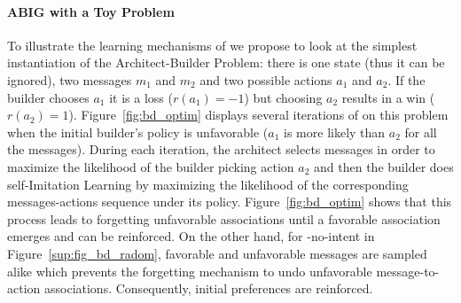 \paragraph{ABIG with a Toy Problem}

To illustrate the learning mechanisms of \abig we propose to look at the simplest instantiation of the Architect-Builder Problem: there is one state (thus it can be ignored), two messages $m_1$ and $m_2$ and two possible actions $a_1$ and $a_2$. If the builder chooses $a_1$ it is a loss ($r(a_1) = -1$) but choosing $a_2$ results in a win ($r(a_2) = 1$). Figure~\ref{fig:bd_optim} displays several iterations of \abig on this problem when the initial builder's policy is unfavorable ($a_1$ is more likely than $a_2$ for all the messages). During each iteration, the architect selects messages in order to maximize the likelihood of the builder picking action $a_2$ and then the builder does self-Imitation Learning by maximizing the likelihood of the corresponding messages-actions sequence under its policy.  Figure~\ref{fig:bd_optim} shows that this process leads to forgetting unfavorable associations until a favorable association emerges and can be reinforced. On the other hand, for \abig-no-intent in Figure~\ref{sup:fig_bd_radom}, favorable and unfavorable messages are sampled alike which prevents the forgetting mechanism to undo unfavorable message-to-action associations. Consequently, initial preferences are reinforced.  
%
